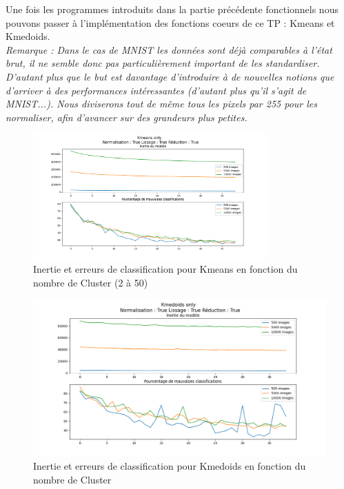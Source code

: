 \documentclass{article}
\begin{document}
Une fois les programmes introduits dans la partie précédente fonctionnels nous pouvons passer à l'implémentation des fonctions coeurs de ce TP : Kmeans et Kmedoids. \\

\textit{Remarque : Dans le cas de MNIST les données sont déjà comparables à l'état brut, il ne semble donc pas particulièrement important de les standardiser. D'autant plus que le but est davantage d'introduire à de nouvelles notions que d'arriver à des performances intéressantes (d'autant plus qu'il s'agit de MNIST...). Nous diviserons tout de même tous les pixels par 255 pour les normaliser, afin d'avancer sur des grandeurs plus petites.}

\begin{figure}[H]
    \centering
    \includegraphics[width=0.8\textwidth]{"./Images/Kmeans_no_prepo_erreur.png"}
    \caption{Inertie et erreurs de classification pour Kmeans en fonction du nombre de Cluster (2 à 50)}
    \label{fig:kmeansnopreproerr}
    
\end{figure}

\begin{figure}[H]
    \centering
    \includegraphics[width=\textwidth]{"./Images/Kmedoids_no_prepo_erreur.png"}
    \caption{Inertie et erreurs de classification pour Kmedoids en fonction du nombre de Cluster}
    \label{fig:kmedoidspapapa}
\end{figure}
\vspace{2mm}
\end{document}
